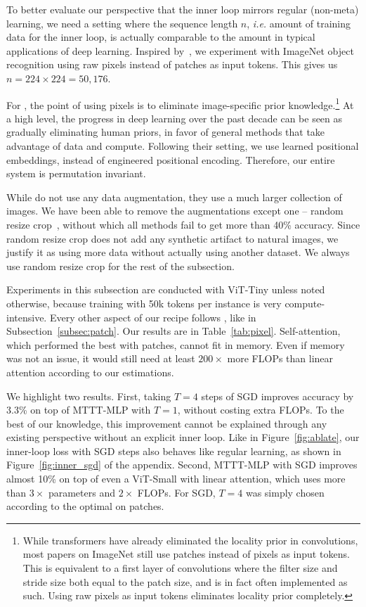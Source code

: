 \documentclass{article} %
\begin{document}
To better evaluate our perspective that the inner loop mirrors regular (non-meta) learning, we need a setting where the sequence length $n$, \textit{i.e.} amount of training data for the inner loop, is actually comparable to the amount in typical applications of deep learning.
Inspired by~\cite{chen2020generative}, we experiment with ImageNet object recognition using raw pixels instead of patches as input tokens.
This gives us $n = 224 \times 224 = 50,176$.

For \cite{chen2020generative}, the point of using pixels is to eliminate image-specific prior knowledge.\footnote{
While transformers have already eliminated the locality prior in convolutions, most papers on ImageNet still use patches instead of pixels as input tokens.
This is equivalent to a first layer of convolutions where the filter size and stride size both equal to the patch size, and is in fact often implemented as such.
Using raw pixels as input tokens eliminates locality prior completely.
}
At a high level, the progress in deep learning over the past decade can be seen as gradually eliminating human priors, in favor of general methods that take advantage of data and compute.
Following their setting, we use learned positional embeddings, instead of engineered positional encoding.
Therefore, our entire system is permutation invariant.

While \cite{chen2020generative} do not use any data augmentation, they use a much larger collection of images. 
We have been able to remove the augmentations except one -- random resize crop~\citep{szegedy2015going}, without which all methods fail to get more than 40\% accuracy. 
Since random resize crop does not add any synthetic artifact to natural images, we justify it as using more data without actually using another dataset.
We always use random resize crop for the rest of the subsection.

Experiments in this subsection are conducted with ViT-Tiny unless noted otherwise, because training with 50k tokens per instance is very compute-intensive.
Every other aspect of our recipe follows \cite{beyer2022better}, like in Subsection~\ref{subsec:patch}.
Our results are in Table~\ref{tab:pixel}.
Self-attention, which performed the best with patches, cannot fit in memory. Even if memory was not an issue, it would still need at least $200\times$ more FLOPs than linear attention according to our estimations.

We highlight two results.
First, taking $T=4$ steps of SGD improves accuracy by 3.3\% on top of MTTT-MLP with $T=1$, without costing extra FLOPs.
To the best of our knowledge, this improvement cannot be explained through any existing perspective without an explicit inner loop.
Like in Figure~\ref{fig:ablate}, our inner-loop loss with SGD steps also behaves like regular learning, as shown in Figure~\ref{fig:inner_sgd} of the appendix.
Second, MTTT-MLP with SGD improves almost 10\% on top of even a ViT-Small with linear attention, which uses more than $3\times$ parameters and $2\times$ FLOPs.
For SGD, $T=4$ was simply chosen according to the optimal on patches.
\end{document}

